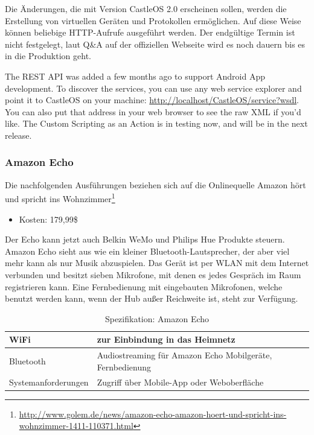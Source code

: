 Die Änderungen, die mit Version CastleOS 2.0 erscheinen sollen, werden die Erstellung von virtuellen Geräten und Protokollen ermöglichen. Auf diese Weise können beliebige HTTP-Aufrufe ausgeführt werden. Der endgültige Termin ist nicht festgelegt, laut  Q\&A auf der offiziellen Webseite wird es noch dauern bis es in die Produktion geht.

\glqq The REST API was added a few months ago to support Android App development. To discover the services, you can use any web service explorer and point it to CastleOS on your machine: \url{http://localhost/CastleOS/service?wsdl}. You can also put that address in your web browser to see the raw XML if you'd like. The Custom Scripting as an Action is in testing now, and will be in the next release.\grqq

\subsubsection{Amazon Echo}
Die nachfolgenden Ausführungen beziehen sich auf die Onlinequelle \glqq Amazon hört und spricht ins Wohnzimmer\grqq\footnote{\url{http://www.golem.de/news/amazon-echo-amazon-hoert-und-spricht-ins-wohnzimmer-1411-110371.html}}

\begin{itemize}
\item Kosten: 179,99\$
\end{itemize}

\noindent
Der Echo kann jetzt auch Belkin WeMo und Philips Hue Produkte steuern. Amazon Echo sieht aus wie ein kleiner Bluetooth-Lautsprecher, der aber viel mehr kann als nur Musik abzuspielen. Das Gerät ist per WLAN mit dem Internet verbunden und besitzt sieben Mikrofone, mit denen es jedes Gespräch im Raum registrieren kann. Eine Fernbedienung mit eingebauten Mikrofonen, welche benutzt werden kann, wenn der Hub außer Reichweite ist, steht zur Verfügung.

\begin{table}[H]
	\begin{tabularx}{\textwidth}{
			>{\hsize=0.5\hsize}X 
			>{\hsize=1.5\hsize}X
		}
		\hline
		WiFi	
		& zur Einbindung in das Heimnetz \\
		\hline 
	 	Bluetooth
		& Audiostreaming für Amazon Echo Mobilgeräte, Fernbedienung \\
		\hline 
	 	Systemanforderungen
		& Zugriff über Mobile-App oder Weboberfläche \\
		\hline
	\end{tabularx}
	\caption{Spezifikation: Amazon Echo}
\end{table}

